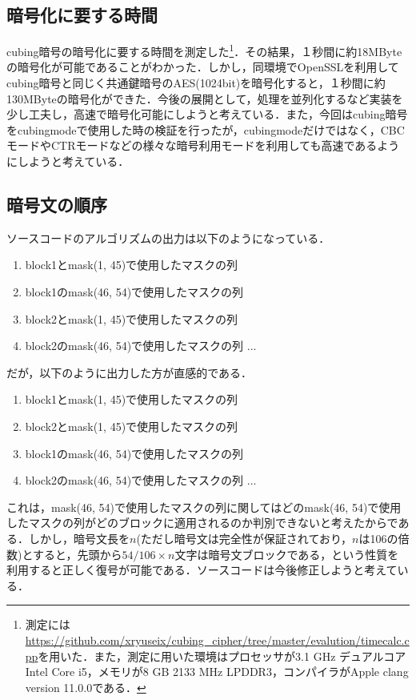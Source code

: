 \documentclass[a4j,titlepage]{jsarticle}
\begin{document}
\subsection{暗号化に要する時間}
cubing暗号の暗号化に要する時間を測定した\footnote{測定には\url{https://github.com/xryuseix/cubing_cipher/tree/master/evalution/timecalc.cpp}を用いた．また，測定に用いた環境はプロセッサが3.1 GHz デュアルコアIntel Core i5，メモリが8 GB 2133 MHz LPDDR3，コンパイラがApple clang version 11.0.0である．}．その結果，１秒間に約18MByteの暗号化が可能であることがわかった．しかし，同環境でOpenSSLを利用してcubing暗号と同じく共通鍵暗号のAES(1024bit)を暗号化すると，１秒間に約130MByteの暗号化ができた．今後の展開として，処理を並列化するなど実装を少し工夫し，高速で暗号化可能にしようと考えている．また，今回はcubing暗号をcubingmodeで使用した時の検証を行ったが，cubingmodeだけではなく，CBCモードやCTRモードなどの様々な暗号利用モードを利用しても高速であるようにしようと考えている．

\subsection{暗号文の順序}
ソースコードのアルゴリズムの出力は以下のようになっている．\\
\begin{screen}
  \begin{enumerate}
    \item block1とmask(\phantom{0}1, 45)で使用したマスクの列
    \item block1のmask(46, 54)で使用したマスクの列
    \item block2とmask(\phantom{0}1, 45)で使用したマスクの列
    \item block2のmask(46, 54)で使用したマスクの列 ...
  \end{enumerate}
\end{screen}
だが，以下のように出力した方が直感的である．
\begin{screen}
  \begin{enumerate}
    \item block1とmask(\phantom{0}1, 45)で使用したマスクの列
    \item block2とmask(\phantom{0}1, 45)で使用したマスクの列
    \item block1のmask(46, 54)で使用したマスクの列
    \item block2のmask(46, 54)で使用したマスクの列 ...
  \end{enumerate}
\end{screen}
これは，mask(46, 54)で使用したマスクの列に関してはどのmask(46, 54)で使用したマスクの列がどのブロックに適用されるのか判別できないと考えたからである．しかし，暗号文長を\(n\)(ただし暗号文は完全性が保証されており，\(n\)は106の倍数)とすると，先頭から\(54/106 \times n\)文字は暗号文ブロックである，という性質を利用すると正しく復号が可能である．ソースコードは今後修正しようと考えている．
\end{document}
